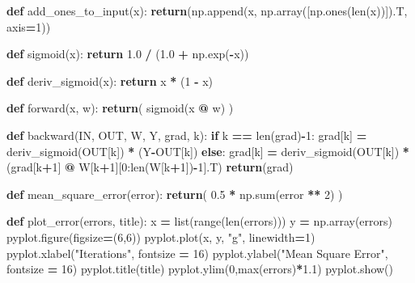 \documentclass[
]{book}
\newenvironment{Shaded}{\begin{snugshade}}{\end{snugshade}}
\newcommand{\BuiltInTok}[1]{#1}
\newcommand{\ControlFlowTok}[1]{\textcolor[rgb]{0.13,0.29,0.53}{\textbf{#1}}}
\newcommand{\DecValTok}[1]{\textcolor[rgb]{0.00,0.00,0.81}{#1}}
\newcommand{\FloatTok}[1]{\textcolor[rgb]{0.00,0.00,0.81}{#1}}
\newcommand{\KeywordTok}[1]{\textcolor[rgb]{0.13,0.29,0.53}{\textbf{#1}}}
\newcommand{\NormalTok}[1]{#1}
\newcommand{\OperatorTok}[1]{\textcolor[rgb]{0.81,0.36,0.00}{\textbf{#1}}}
\newcommand{\StringTok}[1]{\textcolor[rgb]{0.31,0.60,0.02}{#1}}
\begin{document}
\begin{Shaded}
\begin{Highlighting}[]
\KeywordTok{def}\NormalTok{ add\_ones\_to\_input(x):}
  \ControlFlowTok{return}\NormalTok{(np.append(x, np.array([np.ones(}\BuiltInTok{len}\NormalTok{(x))]).T, axis}\OperatorTok{=}\DecValTok{1}\NormalTok{))}


\KeywordTok{def}\NormalTok{ sigmoid(x):}
  \ControlFlowTok{return} \FloatTok{1.0} \OperatorTok{/}\NormalTok{ (}\FloatTok{1.0} \OperatorTok{+}\NormalTok{ np.exp(}\OperatorTok{{-}}\NormalTok{x))}

\KeywordTok{def}\NormalTok{ deriv\_sigmoid(x):}
  \ControlFlowTok{return}\NormalTok{ x }\OperatorTok{*}\NormalTok{ (}\DecValTok{1} \OperatorTok{{-}}\NormalTok{ x)}


\KeywordTok{def}\NormalTok{ forward(x, w):}
  \ControlFlowTok{return}\NormalTok{( sigmoid(x }\OperatorTok{@}\NormalTok{ w) )}

\KeywordTok{def}\NormalTok{ backward(IN, OUT, W, Y, grad, k):}
  \ControlFlowTok{if}\NormalTok{ k }\OperatorTok{==} \BuiltInTok{len}\NormalTok{(grad)}\OperatorTok{{-}}\DecValTok{1}\NormalTok{:}
\NormalTok{    grad[k] }\OperatorTok{=}\NormalTok{ deriv\_sigmoid(OUT[k]) }\OperatorTok{*}\NormalTok{ (Y}\OperatorTok{{-}}\NormalTok{OUT[k])}
  \ControlFlowTok{else}\NormalTok{:}
\NormalTok{    grad[k] }\OperatorTok{=}\NormalTok{ deriv\_sigmoid(OUT[k]) }\OperatorTok{*}\NormalTok{(grad[k}\OperatorTok{+}\DecValTok{1}\NormalTok{] }\OperatorTok{@}\NormalTok{ W[k}\OperatorTok{+}\DecValTok{1}\NormalTok{][}\DecValTok{0}\NormalTok{:}\BuiltInTok{len}\NormalTok{(W[k}\OperatorTok{+}\DecValTok{1}\NormalTok{])}\OperatorTok{{-}}\DecValTok{1}\NormalTok{].T)}
  \ControlFlowTok{return}\NormalTok{(grad)}


\KeywordTok{def}\NormalTok{ mean\_square\_error(error):}
  \ControlFlowTok{return}\NormalTok{( }\FloatTok{0.5} \OperatorTok{*}\NormalTok{ np.}\BuiltInTok{sum}\NormalTok{(error }\OperatorTok{**} \DecValTok{2}\NormalTok{) )}

\KeywordTok{def}\NormalTok{ plot\_error(errors, title):}
\NormalTok{  x }\OperatorTok{=} \BuiltInTok{list}\NormalTok{(}\BuiltInTok{range}\NormalTok{(}\BuiltInTok{len}\NormalTok{(errors)))}
\NormalTok{  y }\OperatorTok{=}\NormalTok{ np.array(errors)}
\NormalTok{  pyplot.figure(figsize}\OperatorTok{=}\NormalTok{(}\DecValTok{6}\NormalTok{,}\DecValTok{6}\NormalTok{))}
\NormalTok{  pyplot.plot(x, y, }\StringTok{"g"}\NormalTok{, linewidth}\OperatorTok{=}\DecValTok{1}\NormalTok{)}
\NormalTok{  pyplot.xlabel(}\StringTok{"Iterations"}\NormalTok{, fontsize }\OperatorTok{=} \DecValTok{16}\NormalTok{)}
\NormalTok{  pyplot.ylabel(}\StringTok{"Mean Square Error"}\NormalTok{, fontsize }\OperatorTok{=} \DecValTok{16}\NormalTok{)}
\NormalTok{  pyplot.title(title)}
\NormalTok{  pyplot.ylim(}\DecValTok{0}\NormalTok{,}\BuiltInTok{max}\NormalTok{(errors)}\OperatorTok{*}\FloatTok{1.1}\NormalTok{)}
\NormalTok{  pyplot.show()}
  

\end{Highlighting}
\end{Shaded}
\end{document}
